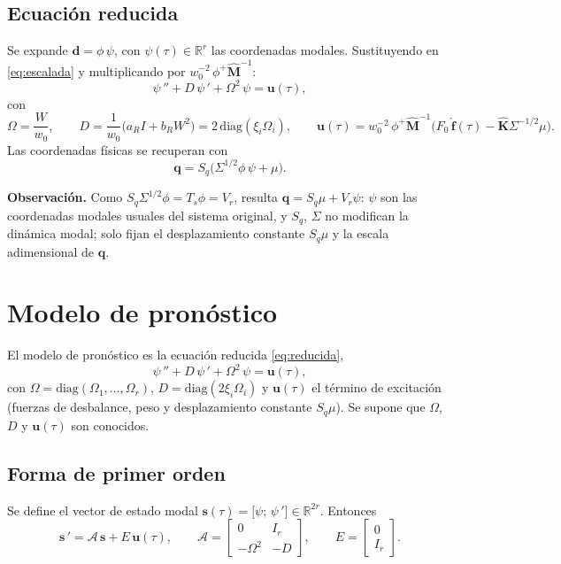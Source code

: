 \subsection{Ecuación reducida}

Se expande $\mathbf d=\phi\,\psi$, con $\psi(\tau)\in\mathbb R^r$ las coordenadas modales. Sustituyendo en 
\eqref{eq:escalada} y multiplicando por $w_0^{-2}\,\phi^{+}\hat{\mathbf M}^{-1}$:
\begin{equation}\label{eq:reducida}
\psi\,''+D\,\psi\,'+\Omega^2\,\psi=\mathbf u(\tau),
\end{equation}
con
\[
\Omega=\frac{W}{w_0},\qquad
D=\frac{1}{w_0}\big(a_RI+b_RW^2\big)=2\,\mathrm{diag}(\xi_i\Omega_i),\qquad
\mathbf u(\tau)=w_0^{-2}\,\phi^{+}\hat{\mathbf M}^{-1}\Big(F_0\,\hat{\mathbf f}(\tau)-\hat{\mathbf K}\Sigma^{-1/2}\mu\Big).
\]
Las coordenadas físicas se recuperan con
\[
\mathbf q=S_q\big(\Sigma^{1/2}\phi\,\psi+\mu\big).
\]

\textbf{Observación.} Como $S_q\Sigma^{1/2}\phi=T_s\phi=V_r$, resulta $\mathbf q=S_q\mu+V_r\psi$: $\psi$ son las coordenadas
modales usuales del sistema original, y $S_q$, $\Sigma$ no modifican la dinámica modal; solo fijan el desplazamiento constante
$S_q\mu$ y la escala adimensional de $\hat{\mathbf q}$.

\section{Modelo de pronóstico}

El modelo de pronóstico es la ecuación reducida \eqref{eq:reducida},
\[
\psi\,''+D\,\psi\,'+\Omega^2\,\psi=\mathbf u(\tau),
\]
con $\Omega=\mathrm{diag}(\Omega_1,\ldots,\Omega_r)$, $D=\mathrm{diag}(2\xi_i\Omega_i)$ y $\mathbf u(\tau)$ el término de excitación (fuerzas de desbalance, peso y desplazamiento constante $S_q\mu$). Se supone que $\Omega$, $D$ y $\mathbf u(\tau)$ son conocidos.

\subsection{Forma de primer orden}

Se define el vector de estado modal $\mathbf s(\tau)=\big[\psi;\,\psi\,'\big]\in\mathbb R^{2r}$. Entonces
\[
\mathbf s\,'=\mathcal A\,\mathbf s+E\,\mathbf u(\tau),\qquad
\mathcal A=\begin{bmatrix}0&I_r\\-\Omega^2&-D\end{bmatrix},\qquad
E=\begin{bmatrix}0\\I_r\end{bmatrix}.
\]

